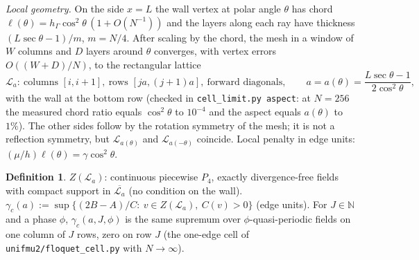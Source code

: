 \documentclass[11pt]{article}
\theoremstyle{definition}
\newtheorem{definition}[theorem]{Definition}
\theoremstyle{remark}
\newcommand{\hG}{h_\Gamma}
\begin{document}
\emph{Local geometry.} On the side $x=L$ the wall vertex at polar angle $\theta$ has chord $\ell(\theta)=\hG\cos^2\theta\,(1+O(N^{-1}))$ and the layers along each ray have thickness $(L\sec\theta-1)/m$, $m=N/4$. After scaling by the chord, the mesh in a window of $W$ columns and $D$ layers around $\theta$ converges, with vertex errors $O((W+D)/N)$, to the rectangular lattice
\[
\mathcal L_a:\ \text{columns }[i,i+1],\ \text{rows }[ja,(j+1)a],\ \text{forward diagonals},\qquad a=a(\theta)=\frac{L\sec\theta-1}{2\cos^2\theta},
\]
with the wall at the bottom row (checked in \texttt{cell\_limit.py aspect}: at $N=256$ the measured chord ratio equals $\cos^2\theta$ to $10^{-4}$ and the aspect equals $a(\theta)$ to $1\%$). The other sides follow by the rotation symmetry of the mesh; it is not a reflection symmetry, but $\mathcal L_{a(\theta)}$ and $\mathcal L_{a(-\theta)}$ coincide. Local penalty in edge units: $(\mu/h)\ell(\theta)=\gamma\cos^2\theta$.

\begin{definition}
$Z(\mathcal L_a)$: continuous piecewise $P_4$, exactly divergence-free fields with compact support in $\overline{\mathcal L_a}$ (no condition on the wall). $\gamma_c(a):=\sup\{(2B-A)/C:\ v\in Z(\mathcal L_a),\ C(v)>0\}$ (edge units). For $J\in\mathbb N$ and a phase $\phi$, $\gamma_c(a,J,\phi)$ is the same supremum over $\phi$-quasi-periodic fields on one column of $J$ rows, zero on row $J$ (the one-edge cell of \texttt{unifmu2/floquet\_cell.py} with $N\to\infty$).
\end{definition}
\end{document}
